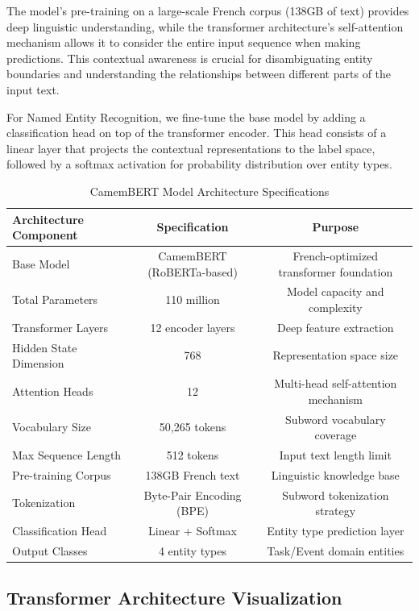 \documentclass[12pt,a4paper]{article}
\begin{document}
The model's pre-training on a large-scale French corpus (138GB of text) provides deep linguistic understanding, while the transformer architecture's self-attention mechanism allows it to consider the entire input sequence when making predictions. This contextual awareness is crucial for disambiguating entity boundaries and understanding the relationships between different parts of the input text.

For Named Entity Recognition, we fine-tune the base model by adding a classification head on top of the transformer encoder. This head consists of a linear layer that projects the contextual representations to the label space, followed by a softmax activation for probability distribution over entity types.

\begin{table}[H]
\centering
\begin{tabular}{|l|c|c|}
\hline
\textbf{Architecture Component} & \textbf{Specification} & \textbf{Purpose} \\
\hline
Base Model & CamemBERT (RoBERTa-based) & French-optimized transformer foundation \\
\hline
Total Parameters & 110 million & Model capacity and complexity \\
\hline
Transformer Layers & 12 encoder layers & Deep feature extraction \\
\hline
Hidden State Dimension & 768 & Representation space size \\
\hline
Attention Heads & 12 & Multi-head self-attention mechanism \\
\hline
Vocabulary Size & 50,265 tokens & Subword vocabulary coverage \\
\hline
Max Sequence Length & 512 tokens & Input text length limit \\
\hline
Pre-training Corpus & 138GB French text & Linguistic knowledge base \\
\hline
Tokenization & Byte-Pair Encoding (BPE) & Subword tokenization strategy \\
\hline
Classification Head & Linear + Softmax & Entity type prediction layer \\
\hline
Output Classes & 4 entity types & Task/Event domain entities \\
\hline
\end{tabular}
\caption{CamemBERT Model Architecture Specifications}
\end{table}

\subsection{Transformer Architecture Visualization}
\end{document}
